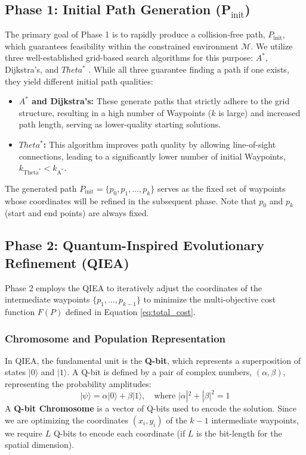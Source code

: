 \subsection{Phase 1: Initial Path Generation (P$_{\text{init}}$)}
The primary goal of Phase 1 is to rapidly produce a collision-free path, $P_{\text{init}}$, which guarantees feasibility within the constrained environment $\mathcal{M}$. We utilize three well-established grid-based search algorithms for this purpose: $A^{*}$, Dijkstra's, and $Theta^{*}$ \cite{ref5}. While all three guarantee finding a path if one exists, they yield different initial path qualities:
\begin{itemize}
    \item \textbf{$A^{*}$ and Dijkstra's:} These generate paths that strictly adhere to the grid structure, resulting in a high number of Waypoints ($k$ is large) and increased path length, serving as lower-quality starting solutions.
    \item \textbf{$Theta^{*}$:} This algorithm improves path quality by allowing line-of-sight connections, leading to a significantly lower number of initial Waypoints, $k_{\text{Theta}^{*}} < k_{\text{A}^{*}}$.
\end{itemize}
The generated path $P_{\text{init}} = \{p_0, p_1, \ldots, p_k\}$ serves as the fixed set of waypoints whose coordinates will be refined in the subsequent phase. Note that $p_0$ and $p_k$ (start and end points) are always fixed.


\subsection{Phase 2: Quantum-Inspired Evolutionary Refinement (QIEA)}
Phase 2 employs the QIEA to iteratively adjust the coordinates of the intermediate waypoints $\{p_1, \ldots, p_{k-1}\}$ to minimize the multi-objective cost function $F(P)$ defined in Equation \eqref{eq:total_cost}.

\subsubsection{Chromosome and Population Representation}
In QIEA, the fundamental unit is the \textbf{Q-bit}, which represents a superposition of states $|0\rangle$ and $|1\rangle$. A Q-bit is defined by a pair of complex numbers, $(\alpha, \beta)$, representing the probability amplitudes:
\begin{equation}
    |\psi\rangle = \alpha|0\rangle + \beta|1\rangle, \quad \text{where } |\alpha|^2 + |\beta|^2 = 1
    \label{eq:qbit}
\end{equation}
A \textbf{Q-bit Chromosome} is a vector of Q-bits used to encode the solution. Since we are optimizing the coordinates $(x_i, y_i)$ of the $k-1$ intermediate waypoints, we require $L$ Q-bits to encode each coordinate (if $L$ is the bit-length for the spatial dimension).


